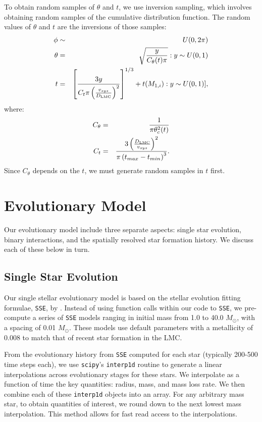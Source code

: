 \documentclass[12pt, preprint]{aastex}
\newcommand{\Msun}{\ifmmode {M_{\odot}}\else${M_{\odot}}$\fi}
\begin{document}
 To obtain random samples of $\theta$ and $t$, we use inversion sampling, which involves obtaining random samples of the cumulative distribution function. The random values of $\theta$ and $t$ are the inversions of those samples:
 \begin{eqnarray}
\phi &\sim& U(0, 2\pi) \\
\theta &=& \sqrt{\frac{y}{C_{\theta}(t) \pi}}: y \sim U(0,1) \\
t &=& \left[ \frac{3y}{C_t \pi \left( \frac{v_{sys}}{D_{\rm LMC}} \right)^2} \right]^{1/3} + t(M_{1,i}): y \sim U(0,1)], 
\end{eqnarray}
where:
\begin{eqnarray}
C_{\theta} &=& \frac{1}{\pi \theta_c^2(t)} \\
C_t &=& \frac{ 3 \left( \frac{D_{\rm LMC}}{v_{sys}} \right)^2 }{ \pi \left( t_{max} - t_{min} \right)^3 }.
\end{eqnarray}
Since $C_{\theta}$ depends on the $t$, we must generate random samples in $t$ first. 





\section{Evolutionary Model}

Our evolutionary model include three separate aspects: single star evolution, binary interactions, and the spatially resolved star formation history. We discuss each of these below in turn.


\subsection{Single Star Evolution} \label{sec:single_star}

Our single stellar evolutionary model is based on the stellar evolution fitting formulae, {\tt SSE}, by \citet{hurley00}. Instead of using function calls within our code to {\tt SSE}, we pre-compute a series of {\tt SSE} models ranging in initial mass from 1.0 to 40.0 \Msun, with a spacing of 0.01 \Msun. These models use default parameters with a metallicity of 0.008 to match that of recent star formation in the LMC.

From the evolutionary history from {\tt SSE} computed for each star (typically 200-500 time steps each), we use {\tt scipy}'s {\tt interp1d} routine to generate a linear interpolations across evolutionary stages for these stars. We interpolate as a function of time the key quantities: radius, mass, and mass loss rate. We then combine each of these {\tt interp1d} objects into an array. For any arbitrary mass star, to obtain quantities of interest, we round down to the next lowest mass interpolation. This method allows for fast read access to the interpolations. 
\end{document}
